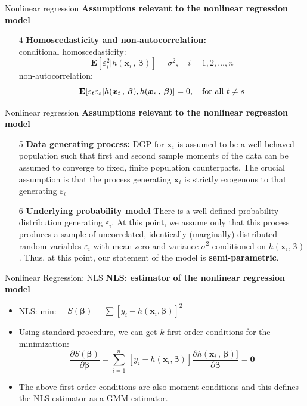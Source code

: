 \documentclass{beamer}
\begin{document}
\begin{frame}{Nonlinear regression}
\textbf{Assumptions relevant to the nonlinear regression model}\\
\medskip
\begin{itemize}
 \item[4] \textbf{Homoscedasticity and non-autocorrelation:}\\
 \medskip
 conditional homoscedasticity:
 $$
 \mathbf{E}[\varepsilon_i^2| h(\bm{x}_i\, , \,\bm{\beta})] = \sigma^2, \quad i=1,2,\dots,n
 $$
 non-autocorrelation:
 $$
 \mathbf{E}[\varepsilon_t\varepsilon_s| h(\bm{x}_t\, , \,\bm{\beta}), h(\bm{x}_s\, , \,\bm{\beta})] = 0, \quad \textnormal{for all~}t\neq s
 $$
\end{itemize}
\end{frame}
\begin{frame}{Nonlinear regression}
\textbf{Assumptions relevant to the nonlinear regression model}\\
\medskip
\begin{itemize}
\item[5] \textbf{Data generating process:} DGP for $\bm{x}_i$ is assumed to be a well-behaved population such that first and second sample moments of the data can be assumed to converge to fixed, finite population counterparts. The crucial assumption is that the process generating $\bm{x}_i$ is strictly exogenous to that generating $\varepsilon_i$
\item[6] \textbf{Underlying probability model} There is a well-defined probability distribution generating $\varepsilon_i$. At this point, we assume only that this process produces a sample of uncorrelated, identically (marginally) distributed random variables $\varepsilon_i$ with mean zero and variance $\sigma^2$ conditioned on $h(\bm{x}_i, \bm{\beta})$. Thus, at this point, our statement of the model is \textbf{semi-parametric}.
\end{itemize}
\end{frame}
\begin{frame}{Nonlinear Regression: NLS}
\textbf{NLS: estimator of the nonlinear regression model}\\
\bigskip
\begin{itemize}
\item NLS: \qquad min:~~ $S(\bm{\beta})=\sum[y_i-h(\bm{x}_i, \bm{\beta})]^2$
\medskip
\item Using standard procedure, we can get $k$ first order conditions for the minimization:
$$
\frac{\partial S(\bm{\beta})}{\partial \bm{\beta} } = 
\sum_{i=1}^n \, [y_i-h(\bm{x}_i, \bm{\beta})] 
\frac{\partial h(\bm{x}_i\, , \,\bm{\beta})]}{\partial \bm{\beta}}
= \bm{0}
$$

\end{itemize}
\smallskip
\begin{itemize}
\item The above first order conditions are also moment conditions and this defines the NLS estimator as a GMM estimator.
\end{itemize}
\end{frame}
\end{document}
